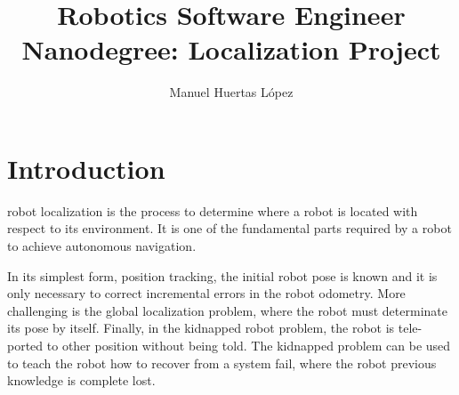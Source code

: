 \documentclass[10pt,journal,compsoc]{IEEEtran}
\begin{document}
\title{Robotics Software Engineer Nanodegree: Localization Project}

\author{Manuel Huertas L\'opez}

%
{}


\maketitle
\IEEEdisplaynontitleabstractindextext
\IEEEpeerreviewmaketitle

\section{Introduction}
\label{sec:introduction}
 robot localization is the process to determine where a robot is located with respect to its environment. It is one of the fundamental parts required by a robot to achieve autonomous navigation.

In its simplest form, position tracking, the initial robot pose is known and it is only necessary to correct incremental errors in the robot odometry. More challenging is the global localization problem, where the robot must determinate its pose by itself. Finally, in the kidnapped robot problem, the robot is tele-ported to other position without being told. The kidnapped problem can be used to teach the robot how to recover from a system fail, where the robot previous knowledge is complete lost.
\end{document}
